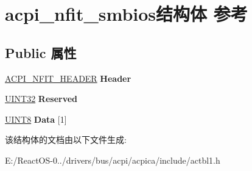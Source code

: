 \hypertarget{structacpi__nfit__smbios}{}\section{acpi\+\_\+nfit\+\_\+smbios结构体 参考}
\label{structacpi__nfit__smbios}
\subsection*{Public 属性}
\begin{DoxyCompactItemize}
\item 
\mbox{\label{structacpi__nfit__smbios_ada36000fe63d7216462e4117b9dd8fcf}} 
\hyperlink{structacpi__nfit__header}{A\+C\+P\+I\+\_\+\+N\+F\+I\+T\+\_\+\+H\+E\+A\+D\+ER} {\bfseries Header}
\item 
\mbox{\label{structacpi__nfit__smbios_a254e5d2b7420775179eee14ed0e0147e}} 
\hyperlink{_processor_bind_8h_ae1e6edbbc26d6fbc71a90190d0266018}{U\+I\+N\+T32} {\bfseries Reserved}
\item 
\mbox{\label{structacpi__nfit__smbios_a6799694ff2cfd29a3f79dfa9f7d8b9fb}} 
\hyperlink{_processor_bind_8h_ab27e9918b538ce9d8ca692479b375b6a}{U\+I\+N\+T8} {\bfseries Data} \mbox{[}1\mbox{]}
\end{DoxyCompactItemize}


该结构体的文档由以下文件生成\+:\begin{DoxyCompactItemize}
\item 
E\+:/\+React\+O\+S-\/0../drivers/bus/acpi/acpica/include/actbl1.\+h\end{DoxyCompactItemize}
